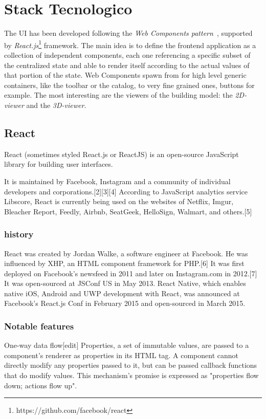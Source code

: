 \section{Stack Tecnologico}
\label{sec:chapter_2_section_3}

The UI has been developed following the \emph{Web Components pattern}~\cite{web_components}, supported by \emph{React.js}\footnote{https://github.com/facebook/react} framework. The main idea is to define the frontend application as a collection of independent components, each one referencing a specific subset of the centralized state and able to render itself according to the actual values of that portion of the state. Web Components spawn from for high level generic containers, like the toolbar or the catalog, to very fine grained ones, buttons for example. The most interesting are the viewers of the building model: the \emph{2D-viewer} and the \emph{3D-viewer}.

\subsection{React}
React (sometimes styled React.js or ReactJS) is an open-source JavaScript library for building user interfaces.

It is maintained by Facebook, Instagram and a community of individual developers and corporations.[2][3][4] According to JavaScript analytics service Libscore, React is currently being used on the websites of Netflix, Imgur, Bleacher Report, Feedly, Airbnb, SeatGeek, HelloSign, Walmart, and others.[5]

\subsubsection{history}
React was created by Jordan Walke, a software engineer at Facebook. He was influenced by XHP, an HTML component framework for PHP.[6] It was first deployed on Facebook's newsfeed in 2011 and later on Instagram.com in 2012.[7] It was open-sourced at JSConf US in May 2013. React Native, which enables native iOS, Android and UWP development with React, was announced at Facebook's React.js Conf in February 2015 and open-sourced in March 2015.

\subsubsection{Notable features}
One-way data flow[edit]
Properties, a set of immutable values, are passed to a component's renderer as properties in its HTML tag. A component cannot directly modify any properties passed to it, but can be passed callback functions that do modify values. This mechanism's promise is expressed as "properties flow down; actions flow up".

